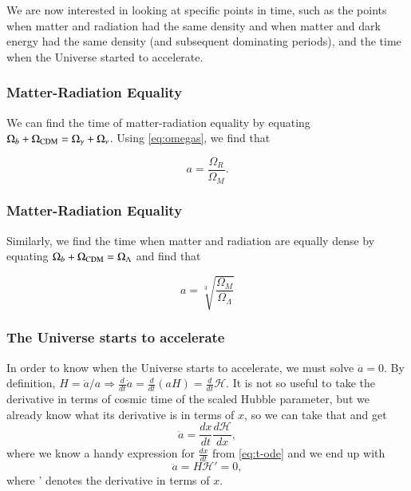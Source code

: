 \documentclass{aa}
\begin{document}
We are now interested in looking at specific points in time, such as the points when matter and radiation had the same density and when matter and dark energy had the same density (and subsequent dominating periods), and the time when the Universe started to accelerate.

\subsubsection{Matter-Radiation Equality}

We can find the time of matter-radiation equality by equating $
\Omega_b + \Omega_{\rm CDM} = \Omega_\gamma + \Omega_{\nu}$. Using \eqref{eq:omegas}, we find that

\begin{equation}
    a = \frac{\Omega_R}{\Omega_M}.
\end{equation}

\subsubsection{Matter-Radiation Equality}

Similarly, we find the time when matter and radiation are equally dense by equating $\Omega_b + \Omega_{\rm CDM} = \Omega_{\Lambda}$ and find that

\begin{equation}
    a = \sqrt[3]{\frac{\Omega_M}{\Omega_{\Lambda}}}
\end{equation}

\subsubsection{The Universe starts to accelerate}

In order to know when the Universe starts to accelerate, we must solve $\ddot a = 0$. By definition, $H = \dot{a}/a \Rightarrow \frac{d}{dt} \dot a = \frac{d}{dt} (aH) = \frac{d}{dt}\mathcal H$. It is not so useful to take the derivative in terms of cosmic time of the scaled Hubble parameter, but we already know what its derivative is in terms of $x$, so we can take that and get
\begin{equation}
    \ddot a = \frac{dx}{dt}\frac{d\mathcal H}{dx},
\end{equation}
where we know a handy expression for $\frac{dx}{dt}$ from \eqref{eq:t-ode} and we end up with
\begin{equation}
    \ddot a = H\mathcal{H'} = 0,
\end{equation}
where ' denotes the derivative in terms of $x$.
\end{document}
